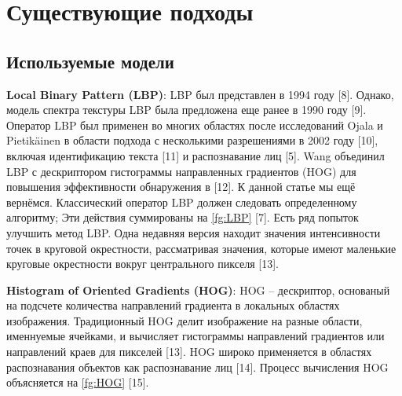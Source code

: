 \documentclass[12pt,twoside]{article}
\begin{document}
\section{Существующие подходы}
\subsection{Используемые модели}
\textbf{Local Binary Pattern (LBP)}: LBP был представлен в 1994 году [8]. Однако, модель спектра текстуры LBP была предложена еще ранее в 1990 году [9]. Оператор LBP был применен во многих областях после исследований Ojala и Pietikäinen в области подхода с несколькими разрешениями в 2002 году [10], включая идентификацию текста [11] и распознавание лиц [5]. Wang объединил LBP с дескриптором гистограммы направленных градиентов (HOG) для повышения эффективности обнаружения в [12]. К данной статье мы ещё вернёмся. Классический оператор LBP должен следовать определенному алгоритму; Эти действия суммированы на \ref{fg:LBP} [7]. Есть ряд попыток улучшить метод LBP. Одна недавняя версия находит значения интенсивности точек в круговой окрестности, рассматривая значения, которые имеют маленькие круговые окрестности вокруг центрального пикселя [13].

\textbf{Histogram of Oriented Gradients (HOG)}: HOG -- дескриптор, основаный на подсчете количества направлений градиента в локальных областях изображения. Традиционный HOG делит изображение на разные области, именнуемые ячейками, и вычисляет гистограммы направлений градиентов или направлений краев для пикселей [13]. HOG широко применяется в областях распознавания объектов как распознавание лиц [14]. Процесс вычисления HOG объясняется на \ref{fg:HOG} [15].
\end{document}
